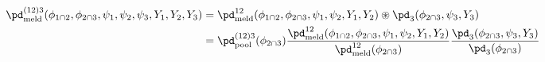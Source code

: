 \begin{align}
  \pd_{\text{meld}}^{(12)3} (\phi_{1 \cap 2}, \phi_{2 \cap 3}, \psi_{1}, \psi_{2}, \psi_{3}, Y_{1}, Y_{2}, Y_{3}) 
    &= 
    \pd_{\text{meld}}^{12}(\phi_{1 \cap 2}, \phi_{2 \cap 3}, \psi_{1}, \psi_{2}, Y_{1}, Y_{2}) 
    \circledast 
    \pd_{3}(\phi_{2 \cap 3}, \psi_{3}, Y_{3}) 
    \\ &= 
    \pd_{\text{pool}}^{(12)3}(\phi_{2 \cap 3})
    \frac{
      \pd_{\text{meld}}^{12}(\phi_{1 \cap 2}, \phi_{2 \cap 3}, \psi_{1}, \psi_{2}, Y_{1}, Y_{2})
    } {
      \pd_{\text{meld}}^{12}(\phi_{2 \cap 3})
    }
    \frac{
      \pd_{3}(\phi_{2 \cap 3}, \psi_{3}, Y_{3})
    } {
      \pd_{3}(\phi_{2 \cap 3})
    }
  \label{eqn:iterated-application-melding-two}
\end{align}